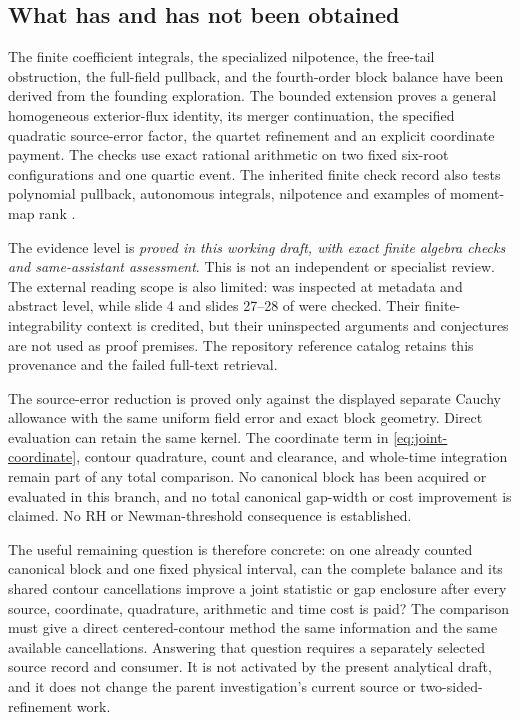 \subsection{What has and has not been obtained}
The finite coefficient integrals, the specialized nilpotence, the
free-tail obstruction, the full-field pullback, and the fourth-order
block balance have been derived from the founding exploration.
The bounded extension proves a general homogeneous exterior-flux
identity, its merger continuation, the specified quadratic source-error
factor, the quartet refinement and an explicit coordinate payment.
The checks use exact rational arithmetic on two fixed six-root
configurations and one quartic event. The inherited finite check
record also tests polynomial pullback, autonomous integrals,
nilpotence and examples of moment-map rank
\cite{BakerConservationBrainstorm2026}.

The evidence level is \emph{proved in this working draft, with exact
finite algebra checks and same-assistant assessment}. This is not an
independent or specialist review. The external reading scope is also
limited: \cite{DeconinckKimuraSegur2007} was inspected at metadata and
abstract level, while slide 4 and slides 27--28 of
\cite{Sokal2023HeatZeros} were checked. Their finite-integrability
context is credited, but their uninspected arguments and conjectures
are not used as proof premises. The repository reference catalog
retains this provenance and the failed full-text retrieval.

The source-error reduction is proved only against the displayed
separate Cauchy allowance with the same uniform field error and
exact block geometry. Direct evaluation can retain the same kernel.
The coordinate term in \eqref{eq:joint-coordinate}, contour
quadrature, count and clearance, and whole-time integration remain
part of any total comparison. No canonical block has been acquired
or evaluated in this branch, and no total canonical gap-width or
cost improvement is claimed. No RH or Newman-threshold consequence
is established.

The useful remaining question is therefore concrete: on one already
counted canonical block and one fixed physical interval, can the
complete balance and its shared contour cancellations improve a
joint statistic or gap enclosure after every source, coordinate,
quadrature, arithmetic and time cost is paid? The comparison must
give a direct centered-contour method the same information and
the same available cancellations. Answering that question requires
a separately selected source record and consumer. It is not
activated by the present analytical draft, and it does not change
the parent investigation's current source or two-sided-refinement
work.
